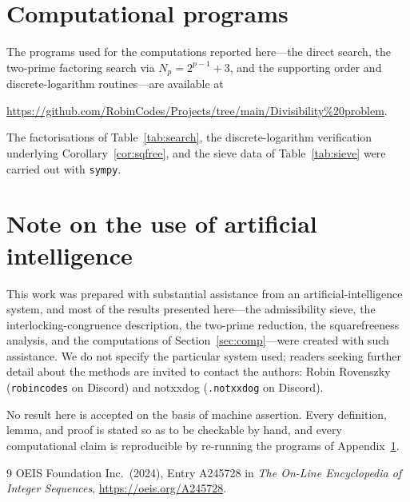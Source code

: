 \documentclass[11pt,reqno]{amsart}
\theoremstyle{plain}
\theoremstyle{definition}
\theoremstyle{remark}
\begin{document}
\appendix

\section{Computational programs}\label{app:programs}
The programs used for the computations reported here---the direct search, the two-prime
factoring search via $N_{p}=2^{p-1}+3$, and the supporting order and discrete-logarithm
routines---are available at
\begin{center}
\url{https://github.com/RobinCodes/Projects/tree/main/Divisibility%20problem}.
\end{center}
The factorisations of Table~\ref{tab:search}, the discrete-logarithm verification underlying
Corollary~\ref{cor:sqfree}, and the sieve data of Table~\ref{tab:sieve} were carried out with
\texttt{sympy}.

\section{Note on the use of artificial intelligence}\label{app:ai}
This work was prepared with substantial assistance from an artificial-intelligence system, and
most of the results presented here---the admissibility sieve, the interlocking-congruence
description, the two-prime reduction, the squarefreeness analysis, and the computations of
Section~\ref{sec:comp}---were created with such assistance. We do not specify the particular
system used; readers seeking further detail about the methods are invited to contact the authors:
Robin Rovenszky (\texttt{robincodes} on Discord) and notxxdog (\texttt{.notxxdog} on Discord).

No result here is accepted on the basis of machine assertion. Every definition, lemma, and proof
is stated so as to be checkable by hand, and every computational claim is reproducible by
re-running the programs of Appendix~\ref{app:programs}.

\begin{thebibliography}{9}
 OEIS Foundation Inc.\ (2024), Entry A245728 in \emph{The On-Line Encyclopedia of
Integer Sequences}, \url{https://oeis.org/A245728}.
\end{thebibliography}
\end{document}

